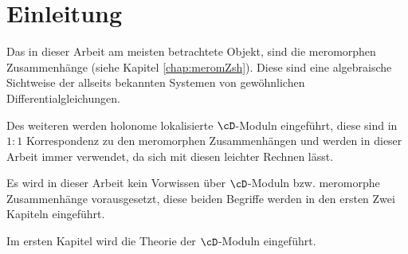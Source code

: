 \chapter{Einleitung}

Das in dieser Arbeit am meisten betrachtete Objekt, sind die meromorphen
Zusammenhänge (siehe Kapitel \ref{chap:meromZsh}). Diese sind eine algebraische
Sichtweise der allseits bekannten Systemen von gewöhnlichen
Differentialgleichungen. 

Des weiteren werden holonome lokalisierte $\cD$-Moduln eingeführt, diese sind
in $1:1$ Korrespondenz zu den meromorphen Zusammenhängen und werden in dieser
Arbeit immer verwendet, da sich mit diesen leichter Rechnen lässt.

\begin{comment}
Riemann-Hilbert-Korrespondenz:
\begin{center}
\begin{tikzcd}
  \left\{ \text{Regulär singuläre holonome $\cD$-Moduln}} \right\}\arrow{r} &
  \left\{ \text{Perverse Garben} \right\} \\
  \left\{ \text{Regulär singuläre meromorphe Zusammenhänge} \right\}
  \arrow[hookrightarrow]{u} \arrow{r} & 
  \left\{ \text{Lokale Systeme} \right\}
\end{tikzcd}
\end{center}
Vergleiche hierzu \cite[Sec 6]{REFKashiwara1984}.
Dies ist ein bekanntes Resultat über regulär singuläre meromorphe
Zusammenhänge, jedoch lässt sich diese Aussage nicht auf irregulär singuläre
meromorphe Zusammenhänge fortsetzen.
\end{comment}

\begin{comment}
Ziel der Arbeit
\end{comment}
\begin{comment}
In dieser Arbeit soll zunächst die Theorie der meromorphen Zusammenhänge
eingeführt werden.
\end{comment}

\begin{comment}
Vorraussetzungen
\end{comment}
Es wird in dieser Arbeit kein Vorwissen über $\cD$-Moduln bzw. meromorphe
Zusammenhänge vorausgesetzt, diese beiden Begriffe werden in den ersten Zwei
Kapiteln eingeführt.

\begin{comment}
Aufbau / inhalt der Kapitel
\end{comment}
Im ersten Kapitel wird die Theorie der $\cD$-Moduln eingeführt.

